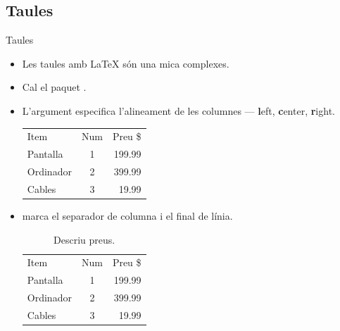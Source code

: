 \subsection{Taules}
\begin{frame}[fragile]{Taules}
\begin{itemize}
\item Les taules amb \LaTeX{} són una mica complexes.
\item Cal el paquet .
\item L'argument especifica l'alineament de les columnes --- \textbf{l}eft, \textbf{c}enter, \textbf{r}ight.
\begin{exampletwouptiny2}
\begin{tabular}{lcr} 
    Item      & Num & Preu \$ \\
    Pantalla  & 1   & 199.99  \\
    Ordinador & 2   & 399.99  \\
    Cables    & 3   & 19.99   \\
\end{tabular}
\end{exampletwouptiny2}
\item \keystrokebftt{\&} marca el separador de columna i \keystrokebftt{\bs\bs} el final de línia. 
\begin{exampletwouptiny2}
\begin{table}  
    \centering %
    \begin{tabular}{lcr}
        Item      & Num & Preu \$ \\
        Pantalla  & 1   & 199.99  \\
        Ordinador & 2   & 399.99  \\
        Cables    & 3   & 19.99   \\
    \end{tabular}
    \caption{Descriu preus.}
    \label{taula:items}
\end{table}
\end{exampletwouptiny2}
\end{itemize}
\end{frame}

